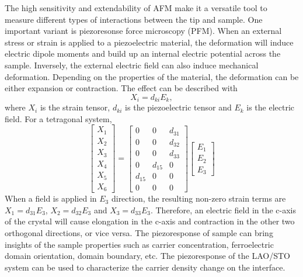 \documentclass[pdflatex, sectionletters, 12pt]{pittetd}    %
\begin{document}
The high sensitivity and extendability of AFM make it a versatile tool to measure different types of interactions between the tip and sample. One important variant is piezoresonse force microscopy (PFM). When an external stress or strain is applied to a piezoelectric material, the deformation will induce electric dipole moments and build up an internal electric potential across the sample. Inversely, the external electric field can also induce mechanical deformation. Depending on the properties of the material, the deformation can be either expansion or contraction. The effect can be described with
$$
X_i = d_{ki}E_k,
$$
where $X_i$ is the strain tensor, $d_{ki}$ is the piezoelectric tensor and $E_k$ is the electric field. For a tetragonal system, 
$$
\begin{bmatrix}
X_{1} \\
X_{2} \\
X_{3} \\
X_{4} \\
X_{5} \\
X_{6}
\end{bmatrix} =
\begin{bmatrix}
0 & 0 & d_{31} \\
0 & 0 & d_{32} \\
0 & 0 & d_{33} \\
0 & d_{15} & 0 \\
d_{15} & 0 & 0 \\
0 & 0 & 0
\end{bmatrix}
\begin{bmatrix}
E_{1} \\
E_{2} \\
E_{3}
\end{bmatrix}
$$
When a field is applied in $E_3$ direction, the resulting non-zero strain terms are $X_1 = d_{31}E_3$, $X_2 = d_{32}E_3$ and $X_3 = d_{33}E_3$. Therefore, an electric field in the c-axis of the crystal will cause elongation in the c-axis and contraction in the other two orthogonal directions, or vice versa. The piezoresponse of sample can bring insights of the sample properties such as carrier concentration\cite{huang2013direct}, ferroelectric domain orientation\cite{soergel2011piezoresponse}, domain boundary\cite{potnis2011review}, etc. The piezoresponse of the LAO/STO system can be used to characterize the carrier density change on the interface.
\end{document}
